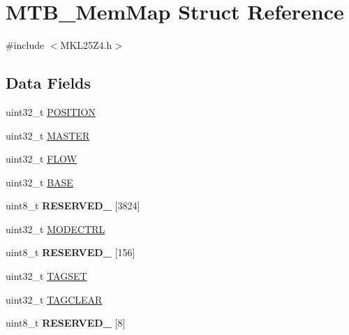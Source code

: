 \hypertarget{struct_m_t_b___mem_map}{}\section{M\+T\+B\+\_\+\+Mem\+Map Struct Reference}
\label{struct_m_t_b___mem_map}


{\ttfamily \#include $<$M\+K\+L25\+Z4.\+h$>$}

\subsection*{Data Fields}
\begin{DoxyCompactItemize}
\item 
uint32\+\_\+t \hyperlink{struct_m_t_b___mem_map_a2cd67baaacfdc2b6a991ed2099abd6cd}{P\+O\+S\+I\+T\+I\+O\+N}
\item 
uint32\+\_\+t \hyperlink{struct_m_t_b___mem_map_aa18cd97b47bac5b1af2e21151a28fce1}{M\+A\+S\+T\+E\+R}
\item 
uint32\+\_\+t \hyperlink{struct_m_t_b___mem_map_a9c9250c96bf782415786243a9e7515a3}{F\+L\+O\+W}
\item 
uint32\+\_\+t \hyperlink{struct_m_t_b___mem_map_aaa2f8b529d9bf3e3bb5bab8c8b073ead}{B\+A\+S\+E}
\item 
\hypertarget{struct_m_t_b___mem_map_a6ec763bccac6d03f5d21615e8190a0cf}{}uint8\+\_\+t {\bfseries R\+E\+S\+E\+R\+V\+E\+D\+\_} \mbox{[}3824\mbox{]}\label{struct_m_t_b___mem_map_a6ec763bccac6d03f5d21615e8190a0cf}

\item 
uint32\+\_\+t \hyperlink{struct_m_t_b___mem_map_a0ac5ad9012eeb1338d251d4fbf72dffb}{M\+O\+D\+E\+C\+T\+R\+L}
\item 
\hypertarget{struct_m_t_b___mem_map_a280910d9fdfd8acf24edab1d3950c732}{}uint8\+\_\+t {\bfseries R\+E\+S\+E\+R\+V\+E\+D\+\_} \mbox{[}156\mbox{]}\label{struct_m_t_b___mem_map_a280910d9fdfd8acf24edab1d3950c732}

\item 
uint32\+\_\+t \hyperlink{struct_m_t_b___mem_map_a64be91040ad6f82ba46ef20d9f4f9dcf}{T\+A\+G\+S\+E\+T}
\item 
uint32\+\_\+t \hyperlink{struct_m_t_b___mem_map_a770a2c3d064a4ccfac867429f7b677da}{T\+A\+G\+C\+L\+E\+A\+R}
\item 
\hypertarget{struct_m_t_b___mem_map_a186e433a83d42ecd6b4e218ea63d9674}{}uint8\+\_\+t {\bfseries R\+E\+S\+E\+R\+V\+E\+D\+\_} \mbox{[}8\mbox{]}\label{struct_m_t_b___mem_map_a186e433a83d42ecd6b4e218ea63d9674}


\end{DoxyCompactItemize}
